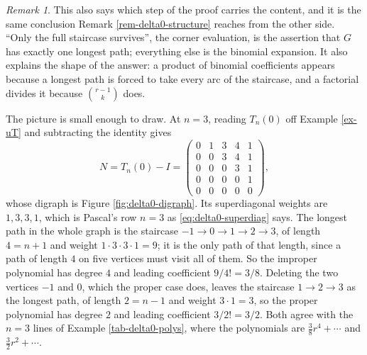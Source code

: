 \documentclass[11pt, a4paper, abstract=yes]{scrartcl}
\theoremstyle{definition}
\theoremstyle{remark}
\newtheorem{remark}[definition]{Remark}
\theoremstyle{plain}
\begin{document}
\begin{remark}
This also says which step of the proof carries the content, and it is the same conclusion
Remark \ref{rem-delta0-structure} reaches from the other side. ``Only the full staircase survives'', the
corner evaluation, is the assertion that \(G\) has exactly one longest path; everything else is the
binomial expansion. It also explains the shape of the answer: a product of binomial coefficients
appears because a longest path is forced to take every arc of the staircase, and a factorial divides
it because \(\binom{r-1}{k}\) does.

The picture is small enough to draw. At \(n=3\), reading \(T_n(0)\) off Example \ref{ex-uT} and
subtracting the identity gives
\[
  N=T_n(0)-I=\begin{pmatrix}
    0&1&3&4&1\\ 0&0&3&4&1\\ 0&0&0&3&1\\ 0&0&0&0&1\\ 0&0&0&0&0
  \end{pmatrix},
\]
whose digraph is Figure \ref{fig:delta0-digraph}. Its superdiagonal weights are
\(1,3,3,1\), which is Pascal's row \(n=3\) as \eqref{eq:delta0-superdiag} says. The longest path
in the whole graph is the staircase \(-1\to0\to1\to2\to3\), of length \(4=n+1\) and weight
\(1\cdot3\cdot3\cdot1=9\); it is the only path of that length, since a path of length \(4\) on
five vertices must visit all of them. So the improper polynomial has degree \(4\) and leading
coefficient \(9/4!=3/8\). Deleting the two vertices \(-1\) and \(0\), which the proper case
does, leaves the staircase \(1\to2\to3\) as the longest path, of length \(2=n-1\) and weight
\(3\cdot1=3\), so the proper polynomial has degree \(2\) and leading coefficient \(3/2!=3/2\).
Both agree with the \(n=3\) lines of Example \ref{tab-delta0-polys}, where the polynomials are
\(\tfrac38r^4+\cdots\) and \(\tfrac32r^2+\cdots\).


\end{remark}
\end{document}
